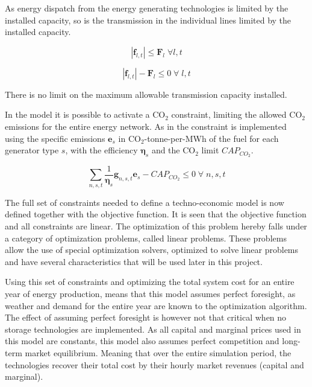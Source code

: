 As energy dispatch from the energy generating technologies is limited by the installed capacity, so is the transmission in the individual lines limited by the installed capacity. 

\begin{equation}
|\mathbf{f}_{l,t}| \leq \mathbf{F}_l \; \forall l,t
\end{equation}

\begin{equation}
|\mathbf{f}_{l,t}| - \mathbf{F}_l  \leq 0 \; \forall \; l,t
\end{equation}

There is no limit on the maximum allowable transmission capacity installed. 

In the model it is possible to activate a $\text{CO}_2$ constraint, limiting the allowed $\text{CO}_2$ emissions for the entire energy network. As in \cite{PyPSA_euro_30_model} the constraint is implemented using the specific emissions $\mathbf{e}_s$ in $\text{CO}_2$-tonne-per-MWh of the fuel for each generator type $s$, with the efficiency $\mathbf{\eta}_s$ and the $\text{CO}_2$ limit $CAP_{CO_2}$. 

\begin{equation}
\sum_{n,s,t} \frac{1}{\mathbf{\eta}_s}\mathbf{g}_{n,s,t} \mathbf{e}_s -CAP_{CO_2} \leq 0 \; \forall \; n,s,t
\end{equation}


The full set of constraints needed to define a techno-economic model is now defined together with the objective function. It is seen that the objective function and all constraints are linear. The optimization of this problem hereby falls under a category of optimization problems, called linear problems. These problems allow the use of special optimization solvers, optimized to solve linear problems and have several characteristics that will be used later in this project.

Using this set of constraints and optimizing the total system cost for an entire year of energy production, means that this model assumes perfect foresight, as weather and demand for the entire year are known to the optimization algorithm. The effect of assuming perfect foresight is however not that critical when no storage technologies are implemented. 
As all capital and marginal prices used in this model are constants, this model also assumes perfect competition and long-term market equilibrium. Meaning that over the entire simulation period, the technologies recover their total cost by their hourly market revenues (capital and marginal).

